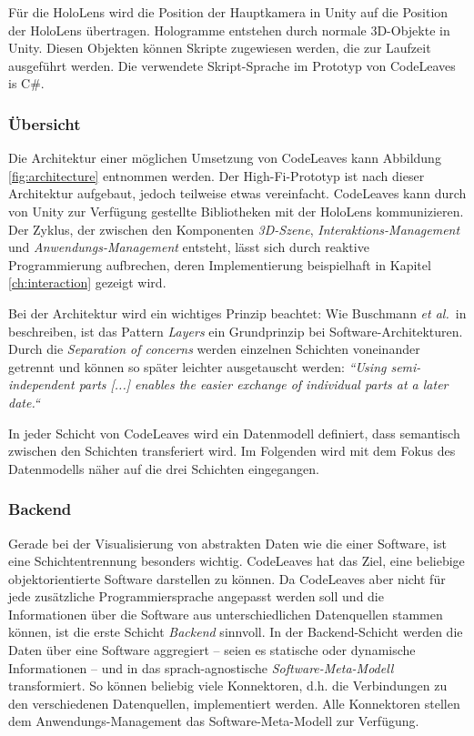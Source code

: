Für die HoloLens wird die Position der Hauptkamera in Unity auf die Position der HoloLens übertragen. Hologramme entstehen durch normale 3D-Objekte in Unity. Diesen Objekten können Skripte zugewiesen werden, die zur Laufzeit ausgeführt werden. Die verwendete Skript-Sprache im Prototyp von CodeLeaves is C\#.

\subsubsection*{Übersicht}

Die Architektur einer möglichen Umsetzung von CodeLeaves kann Abbildung \ref{fig:architecture} entnommen werden. Der High-Fi-Prototyp ist nach dieser Architektur aufgebaut, jedoch teilweise etwas vereinfacht. CodeLeaves kann durch von Unity zur Verfügung gestellte Bibliotheken mit der HoloLens kommunizieren. Der Zyklus, der zwischen den Komponenten \textit{3D-Szene}, \textit{Interaktions-Management} und \textit{Anwendungs-Management} entsteht, lässt sich durch reaktive Programmierung aufbrechen, deren Implementierung beispielhaft in Kapitel \ref{ch:interaction} gezeigt wird.

Bei der Architektur wird ein wichtiges Prinzip beachtet: Wie Buschmann \textit{et al.}\ in \cite{frank2007pattern} beschreiben, ist das Pattern \textit{Layers} ein Grundprinzip bei Software-Architekturen. Durch die \textit{Separation of concerns} werden einzelnen Schichten voneinander getrennt und können so später leichter ausgetauscht werden: \textit{``Using semi-independent parts [...] enables the easier exchange of individual parts at a later date.``} \cite{frank2007pattern}

In jeder Schicht von CodeLeaves wird ein Datenmodell definiert, dass semantisch zwischen den Schichten transferiert wird. Im Folgenden wird mit dem Fokus des Datenmodells näher auf die drei Schichten eingegangen.

\subsubsection*{Backend}
Gerade bei der Visualisierung von abstrakten Daten wie die einer Software, ist eine Schichtentrennung besonders wichtig. CodeLeaves hat das Ziel, eine beliebige objektorientierte Software darstellen zu können. Da CodeLeaves aber nicht für jede zusätzliche Programmiersprache angepasst werden soll und die Informationen über die Software aus unterschiedlichen Datenquellen stammen können, ist die erste Schicht \textit{Backend} sinnvoll. In der Backend-Schicht werden die Daten über eine Software aggregiert -- seien es statische oder dynamische Informationen -- und in das sprach-agnostische \textit{Software-Meta-Modell} transformiert. So können beliebig viele Konnektoren, d.h. die Verbindungen zu den verschiedenen Datenquellen, implementiert werden. Alle Konnektoren stellen dem Anwendungs-Management das Software-Meta-Modell zur Verfügung.


